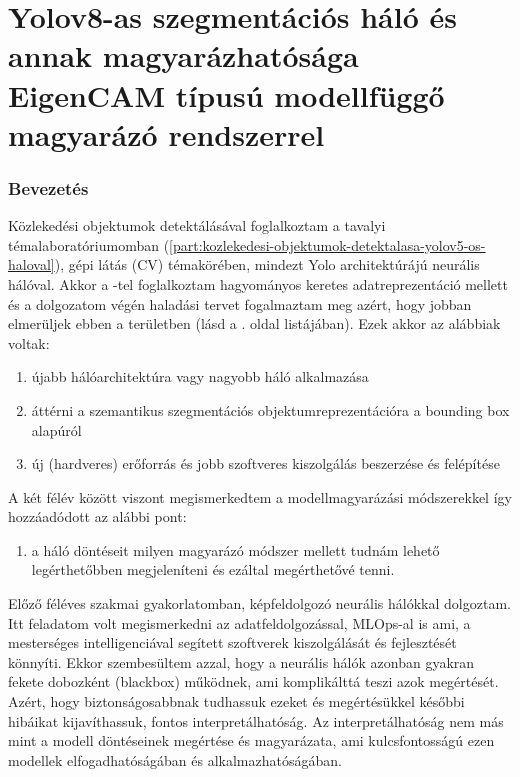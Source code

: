 \documentclass[12pt,oneside,a4paper]{article}
\newcommand{\newsection}[1]{\clearpage\section{#1}}\label{makro}
\theoremstyle{remark}
\begin{document}
\newpage
\thispagestyle{empty}

\vspace*{\fill}
\part{Yolov8-as szegmentációs háló és annak magyarázhatósága EigenCAM típusú modellfüggő magyarázó rendszerrel}\label{part:yolov8-as-szegmentacios-halo-es-annak-magyarazhatosaga-eigencam-tipusu-modellfuggo-magyarazo-rendszerrel}
\vspace*{\fill}
\setcounter{section}{0}
\newsection{Bevezetés}\label{sec:bevezetes}
\pagestyle{fancy}
    Közlekedési objektumok detektálásával foglalkoztam a tavalyi témalaboratóriumomban (\ref{part:kozlekedesi-objektumok-detektalasa-yolov5-os-haloval}),
     gépi látás (\ac{CV}) témakörében, mindezt Yolo architektúrájú neurális hálóval.
    Akkor a -tel foglalkoztam hagyományos keretes adatreprezentáció mellett és a dolgozatom végén
     haladási tervet fogalmaztam meg azért, hogy jobban elmerüljek ebben a területben (lásd a \pageref{célok}. oldal listájában).
Ezek akkor az alábbiak voltak:
\begin{enumerate}[label=\alph*., start=1]\label{enum:tervek}
    \item újabb hálóarchitektúra vagy nagyobb háló alkalmazása
    \item áttérni a szemantikus szegmentációs objektumreprezentációra a bounding box alapúról
    \item új (hardveres) erőforrás és jobb szoftveres kiszolgálás beszerzése és felépítése
\end{enumerate}
A két félév között viszont megismerkedtem a modellmagyarázási módszerekkel így hozzáadódott az alábbi pont:
\begin{enumerate}[label=\alph*., start=4]
    \item a háló döntéseit milyen magyarázó módszer mellett tudnám lehető legérthetőbben megjeleníteni és ezáltal megérthetővé tenni.
\end{enumerate}

    Előző féléves szakmai gyakorlatomban, képfeldolgozó neurális hálókkal dolgoztam.
    Itt feladatom volt megismerkedni az adatfeldolgozással, \ac{MLOps}-al is ami, a mesterséges intelligenciával segített
    szoftverek kiszolgálását és fejlesztését könnyíti.
    Ekkor szembesültem azzal, hogy a neurális hálók azonban gyakran fekete dobozként (blackbox) működnek,
    ami komplikálttá teszi azok megértését.
    Azért, hogy biztonságosabbnak tudhassuk ezeket
    és megértésükkel későbbi hibáikat kijavíthassuk, fontos interpretálhatóság.
    Az interpretálhatóság nem más mint a modell döntéseinek megértése
    és magyarázata, ami kulcsfontosságú ezen modellek elfogadhatóságában és alkalmazhatóságában.
\end{document}
